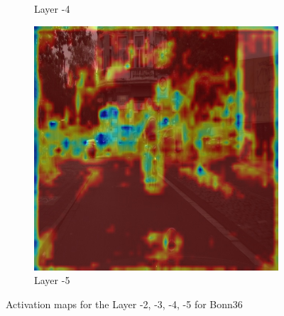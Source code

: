 \begin{figure}[h!]
\begin{subfigure}[b]{0.49\textwidth}
        \caption{Layer -4}
        \label{fig:b-4}
    \end{subfigure}
    \hfill
    \begin{subfigure}[b]{0.49\textwidth}
        \centering
        \includegraphics[width=\textwidth]{figures/bonn_000036_000019_leftImg8bit.pnglayer-5/bonn_000036_000019_leftImg8bit.png_object(0)_heatmap}
        \caption{Layer -5}
        \label{fig:b-5}
    \end{subfigure}
    \hfill

    \caption{Activation maps for the Layer -2, -3, -4, -5 for Bonn36}
    \label{fig:Bonn_000036_000019}
\end{figure}



